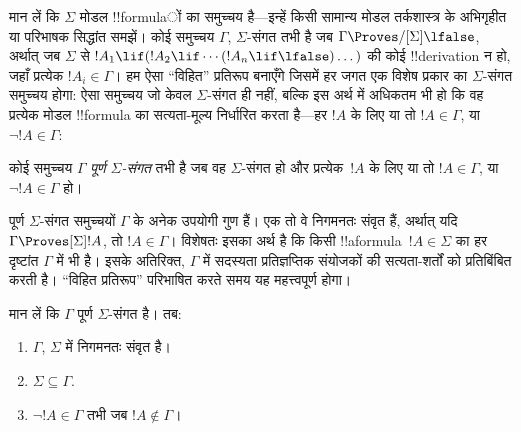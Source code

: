 \documentclass[../../../include/open-logic-section]{subfiles}
\begin{document}


मान लें कि $\Sigma$ मोडल !!{formula}ों का समुच्चय है---इन्हें किसी सामान्य
मोडल तर्कशास्त्र के अभिगृहीत या परिभाषक सिद्धांत समझें। कोई समुच्चय
$\Gamma$, $\Sigma$-संगत तभी है जब $\Gamma \Proves/[\Sigma] \lfalse$,
अर्थात् जब $\Sigma$ से $!A_1 \lif (!A_2 \lif \cdots (!A_n \lif
\lfalse)\dots)$ की कोई !!{derivation} न हो, जहाँ प्रत्येक $!A_i \in
\Gamma$। हम ऐसा ``विहित'' प्रतिरूप बनाएँगे जिसमें हर जगत एक विशेष प्रकार
का $\Sigma$-संगत समुच्चय होगा: ऐसा समुच्चय जो केवल $\Sigma$-संगत ही नहीं,
बल्कि इस अर्थ में अधिकतम भी हो कि वह प्रत्येक मोडल !!{formula} का सत्यता-मूल्य
निर्धारित करता है---हर $!A$ के लिए या तो $!A \in \Gamma$, या $\lnot !A
\in \Gamma$:

\begin{defn}
  कोई समुच्चय $\Gamma$ \emph{पूर्ण $\Sigma$-संगत} तभी है जब वह
  $\Sigma$-संगत हो और प्रत्येक~$!A$ के लिए या तो $!A \in \Gamma$, या
  $\lnot !A \in \Gamma$ हो।
\end{defn}

पूर्ण $\Sigma$-संगत समुच्चयों $\Gamma$ के अनेक उपयोगी गुण हैं। एक तो वे
निगमनतः संवृत हैं, अर्थात् यदि $\Gamma \Proves[\Sigma] !A$, तो $!A \in
\Gamma$। विशेषतः इसका अर्थ है कि किसी !!a{formula}~$!A \in \Sigma$ का हर
दृष्टांत $\Gamma$ में भी है। इसके अतिरिक्त, $\Gamma$ में सदस्यता
प्रतिज्ञप्तिक संयोजकों की सत्यता-शर्तों को प्रतिबिंबित करती है। ``विहित
प्रतिरूप'' परिभाषित करते समय यह महत्त्वपूर्ण होगा।

\begin{prop}
  मान लें कि $\Gamma$ पूर्ण $\Sigma$-संगत है। तब:
  \begin{enumerate}
  \item {}%
    $\Gamma$, $\Sigma$ में निगमनतः संवृत है।
  \item {}%
    $\Sigma \subseteq \Gamma$.
  \item {}%
    $\lnot!A \in \Gamma$ तभी जब $!A \notin \Gamma$।
  \end{enumerate}
\end{prop}
\end{document}
